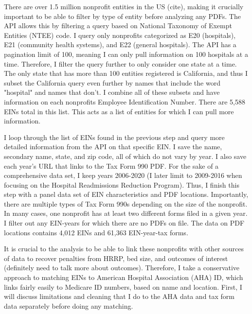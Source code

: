 \documentclass[12pt]{article}
\begin{document}
There are over 1.5 million nonprofit entities in the US (cite), making it crucially important to be able to filter by type of entity before analyzing any PDFs. The API allows this by filtering a query based on National Taxonomy of Exempt Entities (NTEE) code. I query only nonprofits categorized as E20 (hospitals), E21 (community health systems), and E22 (general hospitals). The API has a pagination limit of 100, meaning I can only pull information on 100 hospitals at a time. Therefore, I filter the query further to only consider one state at a time. The only state that has more than 100 entities registered is California, and thus I subset the California query even further by names that include the word "hospital" and names that don't. I combine all of these subsets and have information on each nonprofits Employee Identification Number. There are 5,588 EINs total in this list. This acts as a list of entities for which I can pull more information. 

I loop through the list of EINs found in the previous step and query more detailed information from the API on that specific EIN. I save the name, secondary name, state, and zip code, all of which do not vary by year. I also save each year's URL that links to the Tax Form 990 PDF. For the sake of a comprehensive data set, I keep years 2006-2020 (I later limit to 2009-2016 when focusing on the Hospital Readmissions Reduction Program). Thus, I finish this step with a panel data set of EIN characteristics and PDF locations. Importantly, there are multiple types of Tax Form 990s depending on the size of the nonprofit. In many cases, one nonprofit has at least two different forms filed in a given year. I filter out any EIN-years for which there are no PDFs on file. The data on PDF locations contains 4,012 EINs and 61,363 EIN-year-tax forms.

It is crucial to the analysis to be able to link these nonprofits with other sources of data to recover penalties from HRRP, bed size, and outcomes of interest (definitely need to talk more about outcomes). Therefore, I take a conservative approach to matching EINs to American Hospital Association (AHA) ID, which links fairly easily to Medicare ID numbers, based on name and location. First, I will discuss limitations and cleaning that I do to the AHA data and tax form data separately before doing any matching. 
\end{document}
